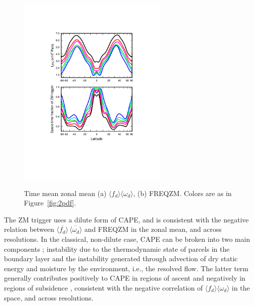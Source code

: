 \begin{figure}[t]
\begin{center}
\noindent\includegraphics[width=17pc,angle=0]{chapter6/temp_zonal_fracd*vomgd.pdf}\\
\end{center}
\caption{Time mean zonal mean (a) $\langle f_{d} \rangle \langle \omega_{d} \rangle$, (b) FREQZM. Colors are as in Figure~\ref{fig:2pdf}.}
\label{fig:vomg}
\end{figure}

The ZM trigger uses a dilute form of CAPE, and is consistent with the negative relation between $\overline{\langle f_{d} \rangle} \, \overline{\langle \omega_{d} \rangle}$ and FREQZM in the zonal mean, and across resolutions. In the classical, non-dilute case, CAPE can be broken into two main components \citep{Z2002JGR}; instability due to the thermodynamic state of parcels in the boundary layer and the instability generated through advection of dry static energy and moisture by the environment, i.e., the resolved flow. The latter term generally contributes positively to CAPE in regions of ascent and negatively in regions of subsidence \citep{SZ2018JCLIM}, consistent with the negative correlation of $\langle f_{d} \rangle \langle \omega_{d} \rangle$ in the space, and across resolutions.

